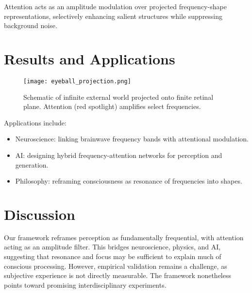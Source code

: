 \documentclass[12pt]{article}
\begin{document}
\begin{theorem}
Attention acts as an amplitude modulation over projected frequency-shape representations, selectively enhancing salient structures while suppressing background noise.
\end{theorem}


\section{Results and Applications}

\begin{figure}[h]
  \centering
  \texttt{[image: eyeball\_projection.png]}
  \caption{Schematic of infinite external world projected onto finite retinal plane. Attention (red spotlight) amplifies select frequencies.}
  \label{fig:projection}
\end{figure}

Applications include:
\begin{itemize}
    \item Neuroscience: linking brainwave frequency bands with attentional modulation.
    \item AI: designing hybrid frequency-attention networks for perception and generation.
    \item Philosophy: reframing consciousness as resonance of frequencies into shapes.
\end{itemize}

\section{Discussion}

Our framework reframes perception as fundamentally frequential, with attention acting as an amplitude filter. This bridges neuroscience, physics, and AI, suggesting that resonance and focus may be sufficient to explain much of conscious processing. However, empirical validation remains a challenge, as subjective experience is not directly measurable. The framework nonetheless points toward promising interdisciplinary experiments.
\end{document}
